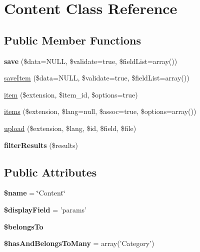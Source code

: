 \hypertarget{class_content}{
\section{\-Content \-Class \-Reference}
\label{class_content}
}
\subsection*{\-Public \-Member \-Functions}
\begin{DoxyCompactItemize}
\item 
\hypertarget{class_content_a5aa30b5bfe817750c6a674a697e05b84}{
{\bfseries save} (\$data=\-N\-U\-L\-L, \$validate=true, \$field\-List=array())}
\label{class_content_a5aa30b5bfe817750c6a674a697e05b84}

\item 
\hyperlink{class_content_a7ee9747ba2041354415d3fda7b5d05aa}{save\-Item} (\$data=\-N\-U\-L\-L, \$validate=true, \$field\-List=array())
\item 
\hyperlink{class_content_ab3a13ad83d2423a47017b07ee0e31ae1}{item} (\$extension, \$item\-\_\-id, \$options=true)
\item 
\hyperlink{class_content_a513b15cf07c136d31c1699ba4d0733f2}{items} (\$extension, \$lang=null, \$assoc=true, \$options=array())
\item 
\hyperlink{class_content_a26aedd9db87f96b37874d9529d3841f7}{upload} (\$extension, \$lang, \$id, \$field, \$file)
\item 
\hypertarget{class_content_a9dd3b8e4c6db46fe56d213553dfc1242}{
{\bfseries filter\-Results} (\$results)}
\label{class_content_a9dd3b8e4c6db46fe56d213553dfc1242}

\end{DoxyCompactItemize}
\subsection*{\-Public \-Attributes}
\begin{DoxyCompactItemize}
\item 
\hypertarget{class_content_af8c3fc14dcbcb6b2f0a396761147e544}{
{\bfseries \$name} = \char`\"{}\-Content\char`\"{}}
\label{class_content_af8c3fc14dcbcb6b2f0a396761147e544}

\item 
\hypertarget{class_content_af06c60c5c6a0cd54ef35b449e744a460}{
{\bfseries \$display\-Field} = 'params'}
\label{class_content_af06c60c5c6a0cd54ef35b449e744a460}

\item 
{\bfseries \$belongs\-To}
\item 
\hypertarget{class_content_a0355358247e364f4a70ec19a6334d2f0}{
{\bfseries \$has\-And\-Belongs\-To\-Many} = array('\-Category')}
\label{class_content_a0355358247e364f4a70ec19a6334d2f0}

\end{DoxyCompactItemize}


